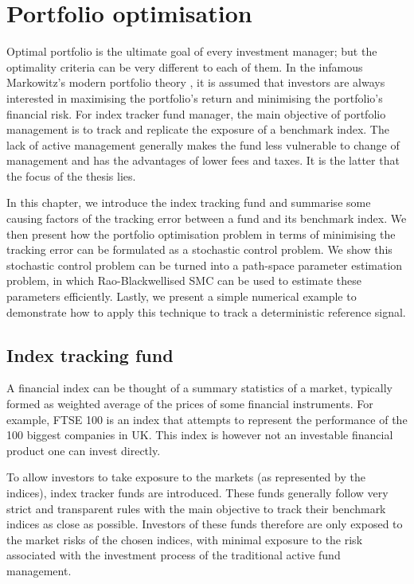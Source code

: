\chapter{Portfolio optimisation}
\graphicspath{{Chapter4/figures/}}
\label{cha:po}
Optimal portfolio is the ultimate goal of every investment manager; but the optimality criteria can be very different to each of them. In the infamous Markowitz's modern portfolio theory \cite{HM52}, it is assumed that investors are always interested in maximising the portfolio's return and minimising the portfolio's financial risk. For index tracker fund manager, the main objective of portfolio management is to track and replicate the exposure of a benchmark index. The lack of active management generally makes the fund less vulnerable to change of management and has the advantages of lower fees and taxes. It is the latter that the focus of the thesis lies.
 
In this chapter, we introduce the index tracking fund and summarise some causing factors of the tracking error between a fund and its benchmark index. We then present how the portfolio optimisation problem in terms of minimising the tracking error can be formulated as a stochastic control problem. We show this stochastic control problem can be turned into a path-space parameter estimation problem, in which Rao-Blackwellised SMC can be used to estimate these parameters efficiently. Lastly, we present a simple numerical example to demonstrate how to apply this technique to track a deterministic reference signal.
 
\section{Index tracking fund}
A financial index can be thought of a summary statistics of a market, typically formed as weighted average of the prices of some financial instruments. For example, FTSE 100 is an index that attempts to represent the performance of the 100 biggest companies in UK. This index is however not an investable financial product one can invest directly.
 
To allow investors to take exposure to the markets (as represented by the indices), index tracker funds are introduced. These funds generally follow very strict and transparent rules with the main objective to track their benchmark indices as close as possible. Investors of these funds therefore are only exposed to the market risks of the chosen indices, with minimal exposure to the risk associated with the investment process of the traditional active fund management.
 
